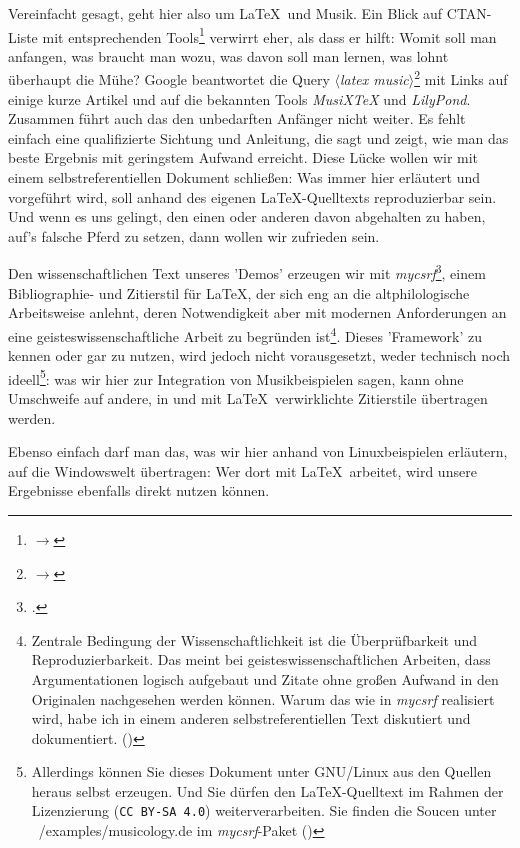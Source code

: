 Vereinfacht gesagt, geht hier also um \LaTeX\ und Musik. Ein Blick auf
CTAN-Liste mit entsprechenden Tools\footnote{$\rightarrow$
} verwirrt eher, als dass er
hilft: Womit soll man anfangen, was braucht man wozu, was davon soll man lernen,
was lohnt überhaupt die Mühe? Google beantwortet die Query
$\langle$\textit{latex music}$\rangle$\footnote{$\rightarrow$
} mit Links auf einige kurze
Artikel und auf die bekannten Tools \textit{MusiX\TeX} und \textit{LilyPond}.
Zusammen führt auch das den unbedarften Anfänger nicht weiter. Es fehlt einfach
eine qualifizierte Sichtung und Anleitung, die sagt und zeigt, wie man das beste
Ergebnis mit geringstem Aufwand erreicht. Diese Lücke wollen wir mit einem
selbstreferentiellen Dokument schließen: Was immer hier erläutert und vorgeführt
wird, soll anhand des eigenen \LaTeX-Quelltexts reproduzierbar sein. Und wenn es
uns gelingt, den einen oder anderen davon abgehalten zu haben, auf's falsche
Pferd zu setzen, dann wollen wir zufrieden sein.

Den wissenschaftlichen Text unseres 'Demos' erzeugen wir mit
\textit{mycsrf}\footcite[vgl.][\nopage wp]{Reincke2018a}, einem Bibliographie- und
Zitierstil für \LaTeX, der sich eng an die altphilologische Arbeitsweise
anlehnt, deren Notwendigkeit aber mit modernen Anforderungen an eine
geisteswissenschaftliche Arbeit zu begründen ist\footnote{Zentrale Bedingung der
Wissenschaftlichkeit ist die Überprüfbarkeit und Reproduzierbarkeit. Das meint
bei geisteswissenschaftlichen Arbeiten, dass Argumentationen logisch aufgebaut
und Zitate ohne großen Aufwand in den Originalen nachgesehen werden können.
Warum das wie in \textit{mycsrf} realisiert wird, habe ich in einem anderen
selbstreferentiellen Text diskutiert und dokumentiert. (\cite[Vgl.
dazu][1ff]{Reincke2018b})}. Dieses 'Framework' zu kennen oder gar zu nutzen,
wird jedoch nicht vorausgesetzt, weder technisch noch ideell\footnote{Allerdings
können Sie dieses Dokument unter GNU/Linux aus den Quellen heraus selbst
erzeugen. Und Sie dürfen den \LaTeX-Quelltext im Rahmen der Lizenzierung
(\texttt{CC BY-SA 4.0}) weiterverarbeiten. Sie finden die Soucen unter
~/examples/musicology.de im \textit{mycsrf}-Paket (\cite[Vgl. dazu][\nopage
wp]{Reincke2019a})}: was wir hier zur Integration von
Musikbeispielen sagen, kann ohne Umschweife auf andere, in und mit \LaTeX\
verwirklichte Zitierstile übertragen werden.

Ebenso einfach darf man das, was wir hier anhand von Linuxbeispielen erläutern,
auf die Windowswelt übertragen: Wer dort mit \LaTeX\ arbeitet, wird unsere
Ergebnisse ebenfalls direkt nutzen können.

